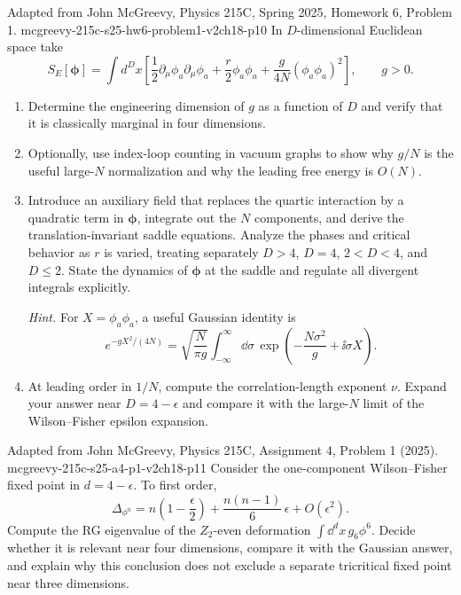 \begin{enumerate}
  {Adapted from John McGreevy, Physics 215C, Spring 2025,
  Homework 6, Problem 1.}
  {mcgreevy-215c-s25-hw6-problem1-v2ch18-p10}
  In \(D\)-dimensional Euclidean space take
  \[
    S_E[\boldsymbol\phi]=\int d^Dx\left[
      \frac12\partial_\mu\phi_a\partial_\mu\phi_a
      +\frac r2\phi_a\phi_a
      +\frac g{4N}(\phi_a\phi_a)^2\right],
      \qquad g>0 .
  \]
  \begin{enumerate}
    \item[(a)]
    Determine the engineering dimension of \(g\) as a function of \(D\)
    and verify that it is classically marginal in four dimensions.
    \item[(b)]
    Optionally, use index-loop counting in vacuum graphs to show why
    \(g/N\) is the useful large-\(N\) normalization and why the leading
    free energy is \(O(N)\).
    \item[(c)]
    Introduce an auxiliary field that replaces the quartic interaction by
    a quadratic term in \(\boldsymbol\phi\), integrate out the \(N\)
    components, and derive the translation-invariant saddle equations.
    Analyze the phases and critical behavior as \(r\) is varied, treating
    separately \(D>4\), \(D=4\), \(2<D<4\), and \(D\le2\).  State the
    dynamics of \(\boldsymbol\phi\) at the saddle and regulate all divergent
    integrals explicitly.

    \emph{Hint.}  For \(X=\phi_a\phi_a\), a useful Gaussian identity is
    \[
      e^{-gX^2/(4N)}
        =\sqrt{\frac{N}{\pi g}}\int_{-\infty}^{\infty}\dd\sigma\,
          \exp\left(-\frac{N\sigma^2}{g}+\ii\sigma X\right).
    \]
    \item[(d)]
    At leading order in \(1/N\), compute the correlation-length exponent
    \(\nu\).  Expand your answer near \(D=4-\epsilon\) and compare it with
    the large-\(N\) limit of the Wilson--Fisher epsilon expansion.
  \end{enumerate}

  \newpage
  {Adapted from John McGreevy, Physics 215C, Assignment 4, Problem 1 (2025).}
  {mcgreevy-215c-s25-a4-p1-v2ch18-p11}
  Consider the one-component Wilson--Fisher fixed point in
  \(d=4-\epsilon\).  To first order,
  \[
    \Delta_{\phi^n}
      =n\left(1-\frac{\epsilon}{2}\right)
       +\frac{n(n-1)}6\,\epsilon+O(\epsilon^2).
  \]
  Compute the RG eigenvalue of the \(Z_2\)-even deformation
  \(\int \dd^dx\,g_6\phi^6\).  Decide whether it is relevant near four
  dimensions, compare it with the Gaussian answer, and explain why this
  conclusion does not exclude a separate tricritical fixed point near
  three dimensions.


\end{enumerate}
